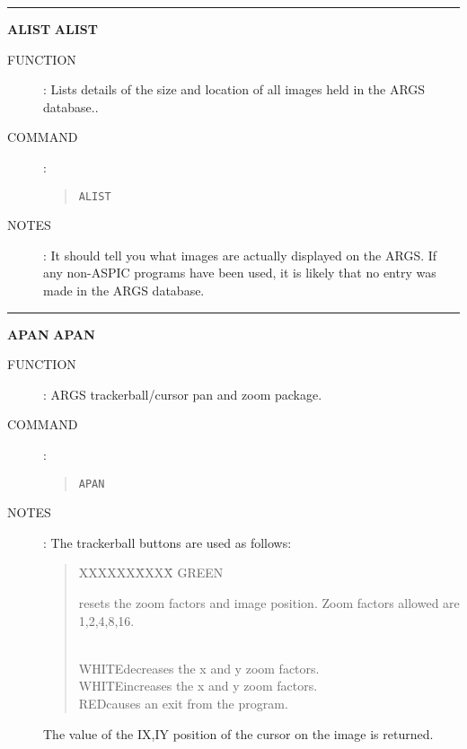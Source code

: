 \goodbreak
\rule{\textwidth}{0.3mm}
{\Large {\bf ALIST} \hfill {\bf ALIST}}
\begin{description}
\item [FUNCTION]:
Lists details of the size and location of all images held in the ARGS database..
\item [COMMAND]:
\begin{quote}
{\tt ALIST}
\end{quote}
\item [NOTES]:
It should tell you what images are actually displayed on the ARGS.
If any non-ASPIC programs have been used, it is likely that no entry was made
in the ARGS database.
\end{description}

\goodbreak
\rule{\textwidth}{0.3mm}
{\Large {\bf APAN} \hfill {\bf APAN}}
\begin{description}
\item [FUNCTION]:
ARGS trackerball/cursor pan and zoom package.
\item [COMMAND]:
\begin{quote}
{\tt APAN}
\end{quote}
\item [NOTES]:
The trackerball buttons are used as follows:
\begin{quote}
\begin{tabbing}
XXXXXX\=XXXX\=\kill
GREEN\>\begin{minipage}[t]{100mm}
resets the zoom factors and image position.
Zoom factors allowed are 1,2,4,8,16.
\end{minipage}\\
WHITE\>decreases the x and y zoom factors.\\
WHITE\>increases the x and y zoom factors.\\
RED\>causes an exit from the program.
\end{tabbing}
\end{quote}
The value of the IX,IY position of the cursor on the image is returned.
\end{description}

